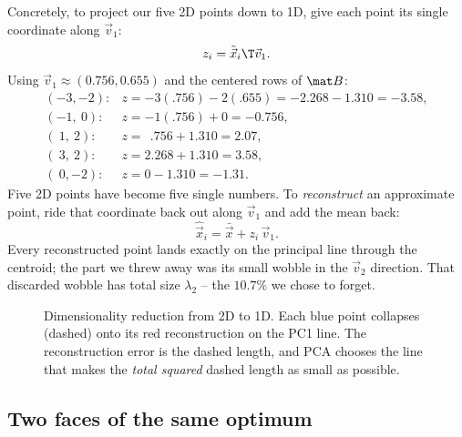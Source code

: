 Concretely, to project our five 2D points down to 1D, give each point its single
coordinate along $\vec v_1$:
\[
  z_i=\tilde{\vec x}_i\T\vec v_1 .
\]
Using $\vec v_1\approx(0.756,0.655)$ and the centered rows of $\mat B$:
\[
  \begin{array}{ll}
  (-3,-2):& z=-3(.756)-2(.655)=-2.268-1.310=-3.58,\\
  (-1,\ 0):& z=-1(.756)+0=-0.756,\\
  (\ 1,\ 2):& z=\ \ .756+1.310=2.07,\\
  (\ 3,\ 2):& z=2.268+1.310=3.58,\\
  (\ 0,-2):& z=0-1.310=-1.31.
  \end{array}
\]
Five 2D points have become five single numbers. To \emph{reconstruct} an
approximate point, ride that coordinate back out along $\vec v_1$ and add the mean
back:
\[
  \hat{\vec x}_i=\bar{\vec x}+z_i\,\vec v_1 .
\]
Every reconstructed point lands exactly on the principal line through the centroid;
the part we threw away was its small wobble in the $\vec v_2$ direction. That
discarded wobble has total size $\lambda_2$ -- the $10.7\%$ we chose to forget.

\begin{figure}[H]
\centering
{}
\caption{Dimensionality reduction from 2D to 1D. Each blue point collapses (dashed)
onto its red reconstruction on the PC1 line. The reconstruction error is the dashed
length, and PCA chooses the line that makes the \emph{total squared} dashed length
as small as possible.}
\label{ch30:reduce}
\end{figure}

\subsection{Two faces of the same optimum}


